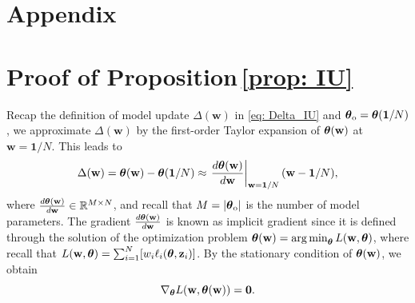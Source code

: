 \onecolumn
\setcounter{section}{0}

\section*{Appendix}

\setcounter{section}{0}
\setcounter{figure}{0}
\makeatletter 
\renewcommand{\thefigure}{A\arabic{figure}}%
\renewcommand{\theHfigure}{A\arabic{figure}}%
\renewcommand{\thetable}{A\arabic{table}}
\renewcommand{\theHtable}{A\arabic{table}}

\makeatother
\setcounter{table}{0}

\setcounter{mylemma}{0}
\renewcommand{\themylemma}{A\arabic{mylemma}}
\setcounter{equation}{0}
\renewcommand{\theequation}{A\arabic{equation}}

\section{Proof of Proposition\,\ref{prop: IU}}
\label{appendix: IU}

Recap the definition of model update $ \Delta(\mathbf w) $ in \eqref{eq: Delta_IU} and $\boldsymbol \theta_\mathrm{o} = \boldsymbol{\theta}(\mathbf 1/N)$,
 we   approximate $ \Delta(\mathbf w) $ by the first-order Taylor expansion of $\boldsymbol{\theta}(\mathbf w)$ at $\mathbf w = \mathbf 1 / N$. This leads to
\begin{equation}
    \Delta(\mathbf w)  = \boldsymbol{\theta}(\mathbf w) - \boldsymbol{\theta}(\mathbf 1 / N) \approx \left. \frac{d \boldsymbol{\theta}(\mathbf w)}{d \mathbf w} \right|_{\mathbf w = \mathbf 1 / N} (\mathbf w - \mathbf 1 / N), \label{eq: Delta_IF}
\end{equation}
where $\frac{d \boldsymbol{\theta}(\mathbf w)}{d \mathbf w} \in \mathbb R^{M \times N}$, and recall that $M = |\boldsymbol \theta_\mathrm{o}|$ is the number of model parameters.  The gradient $\frac{d \boldsymbol{\theta}(\mathbf w)}{d \mathbf w}$ is known as implicit gradient \cite{gould2016differentiating} since it is defined through the solution of the optimization problem
  $\boldsymbol{\theta}(\mathbf w) = \operatorname*{arg\,min}_{\boldsymbol{\theta}} L(\mathbf w, \boldsymbol{\theta})$, where recall that $L(\mathbf w, \boldsymbol{\theta}) = \sum_{i=1}^N [w_i \ell_i (\boldsymbol{\theta}, \mathbf z_i)]$. By the stationary condition of $\boldsymbol{\theta}(\mathbf w)$, we obtain
\begin{equation}
    \nabla_{\boldsymbol{\theta}}L(\mathbf w, \boldsymbol{\theta}(\mathbf w)) = \mathbf 0. \label{eq: L_grad}
\end{equation}

